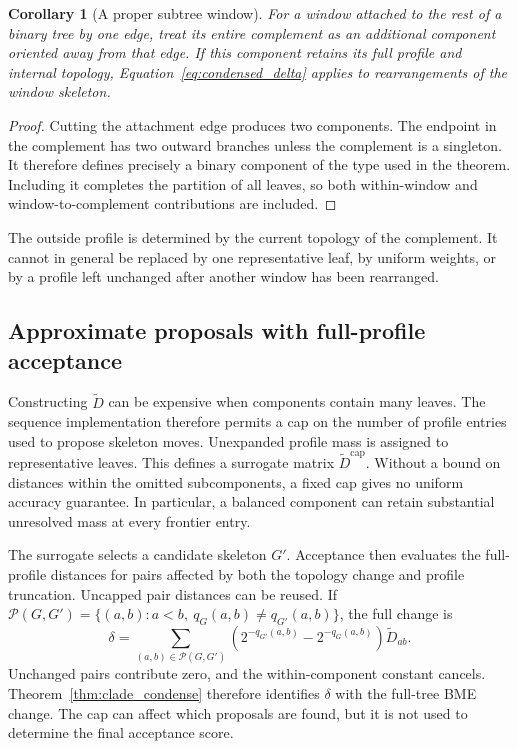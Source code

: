 \documentclass[11pt,a4paper]{article}
\makeatletter
\DeclareRobustCommand{\_}{\ifmmode\nfss@text{\textunderscore}\else\textunderscore\allowbreak\fi}
\newtheorem{corollary}[theorem]{Corollary}
\theoremstyle{definition}
\makeatother
\begin{document}
\begin{corollary}[A proper subtree window]
\label{cor:outside}
For a window attached to the rest of a binary tree by one edge, treat its entire complement as an additional component oriented away from that edge.
If this component retains its full profile and internal topology, Equation~\eqref{eq:condensed_delta} applies to rearrangements of the window skeleton.
\end{corollary}
\begin{proof}
Cutting the attachment edge produces two components.
The endpoint in the complement has two outward branches unless the complement is a singleton.
It therefore defines precisely a binary component of the type used in the theorem.
Including it completes the partition of all leaves, so both within-window and window-to-complement contributions are included.
\end{proof}

The outside profile is determined by the current topology of the complement.
It cannot in general be replaced by one representative leaf, by uniform weights, or by a profile left unchanged after another window has been rearranged.

\subsection{Approximate proposals with full-profile acceptance}
\label{sec:acceptance}

Constructing $\widetilde D$ can be expensive when components contain many leaves.
The sequence implementation therefore permits a cap on the number of profile entries used to propose skeleton moves.
Unexpanded profile mass is assigned to representative leaves.
This defines a surrogate matrix $\widetilde D^{\mathrm{cap}}$.
Without a bound on distances within the omitted subcomponents, a fixed cap gives no uniform accuracy guarantee.
In particular, a balanced component can retain substantial unresolved mass at every frontier entry.

The surrogate selects a candidate skeleton $G'$.
Acceptance then evaluates the full-profile distances for pairs affected by both the topology change and profile truncation.
Uncapped pair distances can be reused.
If $\mathcal P(G,G')=\{(a,b):a<b,\ q_G(a,b)\ne q_{G'}(a,b)\}$, the full change is
\begin{equation}
 \delta=\sum_{(a,b)\in\mathcal P(G,G')}
   \left(2^{-q_{G'}(a,b)}-2^{-q_G(a,b)}\right)
   \widetilde D_{ab}.
 \label{eq:changed_pairs}
\end{equation}
Unchanged pairs contribute zero, and the within-component constant cancels.
Theorem~\ref{thm:clade_condense} therefore identifies $\delta$ with the full-tree BME change.
The cap can affect which proposals are found, but it is not used to determine the final acceptance score.
\end{document}
